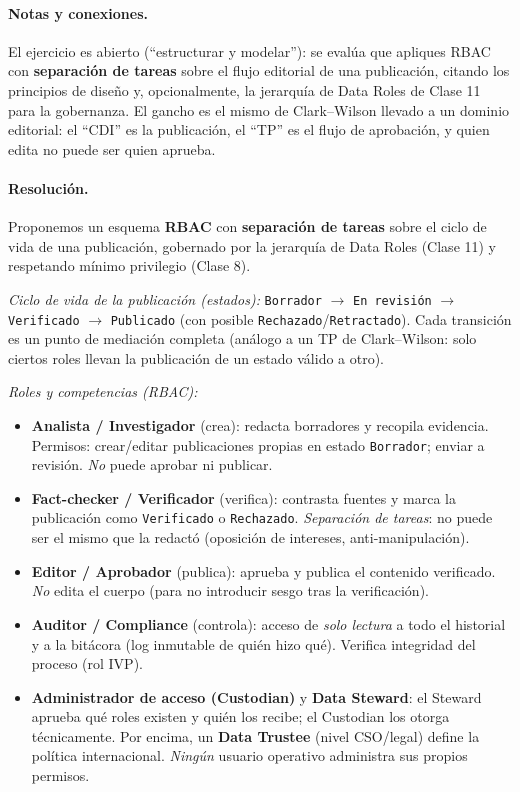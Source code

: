 \paragraph{Notas y conexiones.}
El ejercicio es abierto (``estructurar y modelar''): se evalúa que apliques RBAC con \textbf{separación de tareas} sobre el flujo editorial de una publicación, citando los principios de diseño y, opcionalmente, la jerarquía de Data Roles de Clase 11 para la gobernanza. El gancho es el mismo de Clark--Wilson llevado a un dominio editorial: el ``CDI'' es la publicación, el ``TP'' es el flujo de aprobación, y quien edita no puede ser quien aprueba.

\paragraph{Resolución.}
Proponemos un esquema \textbf{RBAC} con \textbf{separación de tareas} sobre el ciclo de vida de una publicación, gobernado por la jerarquía de Data Roles (Clase 11) y respetando mínimo privilegio (Clase 8).

\emph{Ciclo de vida de la publicación (estados):} \texttt{Borrador} $\to$ \texttt{En revisión} $\to$ \texttt{Verificado} $\to$ \texttt{Publicado} (con posible \texttt{Rechazado}/\texttt{Retractado}). Cada transición es un punto de mediación completa (análogo a un TP de Clark--Wilson: solo ciertos roles llevan la publicación de un estado válido a otro).

\emph{Roles y competencias (RBAC):}
\begin{itemize}
  \item \textbf{Analista / Investigador} (crea): redacta borradores y recopila evidencia. Permisos: crear/editar publicaciones propias en estado \texttt{Borrador}; enviar a revisión. \emph{No} puede aprobar ni publicar.
  \item \textbf{Fact-checker / Verificador} (verifica): contrasta fuentes y marca la publicación como \texttt{Verificado} o \texttt{Rechazado}. \emph{Separación de tareas}: no puede ser el mismo que la redactó (oposición de intereses, anti-manipulación).
  \item \textbf{Editor / Aprobador} (publica): aprueba y publica el contenido verificado. \emph{No} edita el cuerpo (para no introducir sesgo tras la verificación).
  \item \textbf{Auditor / Compliance} (controla): acceso de \emph{solo lectura} a todo el historial y a la bitácora (log inmutable de quién hizo qué). Verifica integridad del proceso (rol IVP).
  \item \textbf{Administrador de acceso (Custodian)} y \textbf{Data Steward}: el Steward aprueba qué roles existen y quién los recibe; el Custodian los otorga técnicamente. Por encima, un \textbf{Data Trustee} (nivel CSO/legal) define la política internacional. \emph{Ningún} usuario operativo administra sus propios permisos.
\end{itemize}

